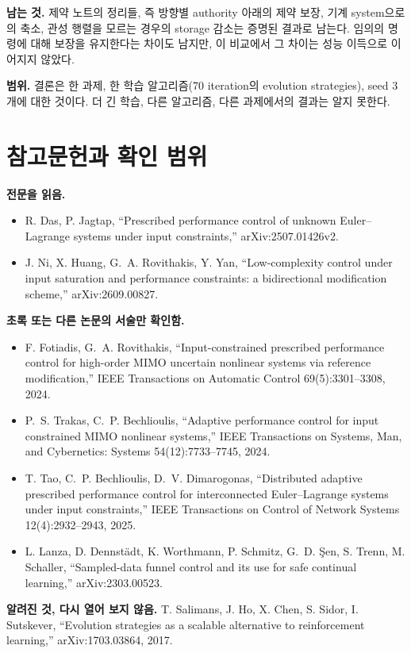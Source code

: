 \documentclass[11pt]{article}\usepackage[margin=1in]{geometry}\usepackage{amsmath,amssymb,amsthm,mathtools}\usepackage{graphicx}\graphicspath{{figures/}{../figures/}{figs/}{./}}\usepackage{enumitem}\usepackage{hyperref}\usepackage{cleveref}\usepackage{tikz}\usetikzlibrary{arrows.meta,positioning,calc,shapes.geometric}\usepackage{float}\usepackage[most]{tcolorbox}\usepackage{kotex}\usepackage{booktabs}\emergencystretch=1.6em\tolerance=2000 \crefname{assumption}{Assumption}{Assumptions}\Crefname{assumption}{Assumption}{Assumptions}\crefname{definition}{Definition}{Definitions}\Crefname{definition}{Definition}{Definitions}\crefname{proposition}{Proposition}{Propositions}\Crefname{proposition}{Proposition}{Propositions}\crefname{fact}{Fact}{Facts}\Crefname{fact}{Fact}{Facts} \newtheorem{assumption}{Assumption}\newtheorem{definition}{Definition}\newtheorem{lemma}{Lemma}\newtheorem{proposition}{Proposition}\newtheorem{theorem}{Theorem}\newtheorem{corollary}{Corollary}\newtheorem{fact}{Fact}\theoremstyle{remark}\newtheorem{remark}{Remark} \newcommand{\R}{\mathbb{R}}\newcommand{\U}{\mathcal U}
\begin{document}
\textbf{남는 것.} 제약 노트의 정리들, 즉 방향별 authority 아래의 제약 보장, 기계 system으로의 축소, 관성 행렬을 모르는 경우의 storage 감소는 증명된 결과로 남는다. 임의의 명령에 대해 보장을 유지한다는 차이도 남지만, 이 비교에서 그 차이는 성능 이득으로 이어지지 않았다.

\textbf{범위.} 결론은 한 과제, 한 학습 알고리즘(70 iteration의 evolution strategies), seed 3개에 대한 것이다. 더 긴 학습, 다른 알고리즘, 다른 과제에서의 결과는 알지 못한다.

\appendix

\section{참고문헌과 확인 범위}
\label{app:refs}

\textbf{전문을 읽음.}
\begin{itemize}
\item R. Das, P. Jagtap, ``Prescribed performance control of unknown Euler--Lagrange systems under input constraints,'' arXiv:2507.01426v2.
\item J. Ni, X. Huang, G.~A. Rovithakis, Y. Yan, ``Low-complexity control under input saturation and performance constraints: a bidirectional modification scheme,'' arXiv:2609.00827.
\end{itemize}

\textbf{초록 또는 다른 논문의 서술만 확인함.}
\begin{itemize}
\item F. Fotiadis, G.~A. Rovithakis, ``Input-constrained prescribed performance control for high-order MIMO uncertain nonlinear systems via reference modification,'' IEEE Transactions on Automatic Control 69(5):3301--3308, 2024.
\item P.~S. Trakas, C.~P. Bechlioulis, ``Adaptive performance control for input constrained MIMO nonlinear systems,'' IEEE Transactions on Systems, Man, and Cybernetics: Systems 54(12):7733--7745, 2024.
\item T. Tao, C.~P. Bechlioulis, D.~V. Dimarogonas, ``Distributed adaptive prescribed performance control for interconnected Euler--Lagrange systems under input constraints,'' IEEE Transactions on Control of Network Systems 12(4):2932--2943, 2025.
\item L. Lanza, D. Dennst\"adt, K. Worthmann, P. Schmitz, G.~D. \c{S}en, S. Trenn, M. Schaller, ``Sampled-data funnel control and its use for safe continual learning,'' arXiv:2303.00523.
\end{itemize}

\textbf{알려진 것, 다시 열어 보지 않음.} T. Salimans, J. Ho, X. Chen, S. Sidor, I. Sutskever, ``Evolution strategies as a scalable alternative to reinforcement learning,'' arXiv:1703.03864, 2017.
\end{document}
